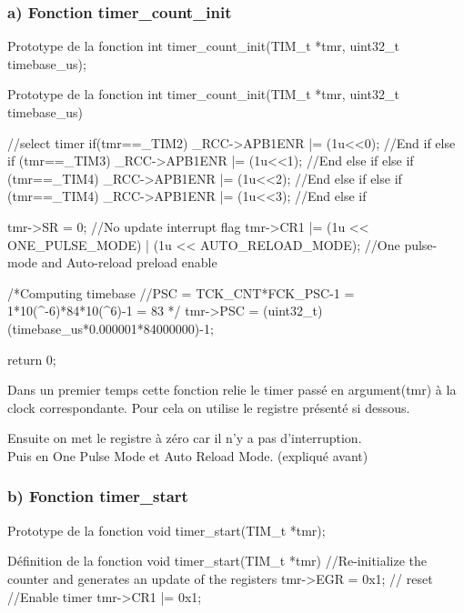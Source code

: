 {\subsubsection{a) Fonction timer\_count\_init}
\begin{Cpp}{Prototype de la fonction} 
int timer_count_init(TIM_t *tmr, uint32_t timebase_us);
\end{Cpp}

\begin{Cpp}{Prototype de la fonction } 
int timer_count_init(TIM_t *tmr, uint32_t timebase_us)  {

		//select timer
		if(tmr==_TIM2) {
			_RCC->APB1ENR |= (1u<<0);	
		}//End if
		else if (tmr==_TIM3) {
			_RCC->APB1ENR |= (1u<<1);
		}//End else if
		else if (tmr==_TIM4) {
			_RCC->APB1ENR |= (1u<<2);
		}//End else if		
		else if (tmr==_TIM4) {
			_RCC->APB1ENR |= (1u<<3);
		}//End else if	
        
    	tmr->SR = 0; 														//No update interrupt flag
    	tmr->CR1 |=  (1u << ONE_PULSE_MODE) | (1u << AUTO_RELOAD_MODE);		//One pulse-mode and Auto-reload preload enable

		/*Computing timebase
		//PSC = TCK_CNT*FCK_PSC-1 = 1*10(^-6)*84*10(^6)-1 = 83
		*/
		tmr->PSC = (uint32_t) (timebase_us*0.000001*84000000)-1; 

		return 0;

}
\end{Cpp}

Dans un premier temps cette fonction relie le timer passé en argument(tmr) à la clock correspondante. Pour cela on utilise le registre  présenté si dessous.

Ensuite on met le registre  à zéro car il n'y a pas d'interruption.\\
Puis  en One Pulse Mode et Auto Reload Mode.
(expliqué avant)


\newpage
\subsubsection{b) Fonction timer\_start}
\begin{Cpp}{Prototype de la fonction} 
void timer_start(TIM_t *tmr);
\end{Cpp}

\begin{Cpp}{Définition de la fonction} 
void timer_start(TIM_t *tmr) {
		//Re-initialize the counter and generates an update of the registers
		tmr->EGR = 0x1;		// reset
		//Enable timer
		tmr->CR1 |= 0x1; 
}
\end{Cpp}

}
